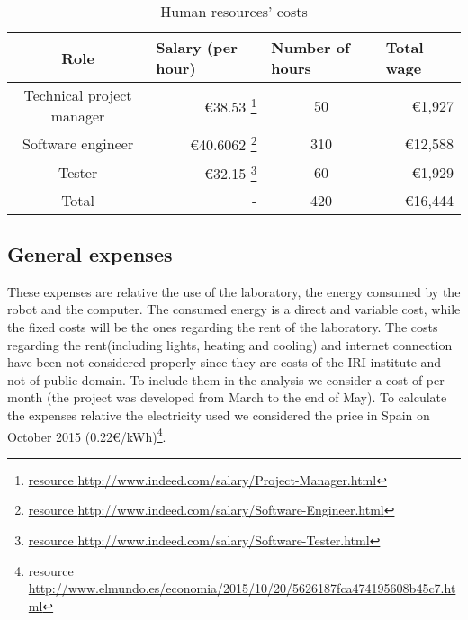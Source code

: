 \begin{savenotes}%
\begin{table}[ht]
  \centering
  \begin{tabular}{|c|r|c|r|}
    \hline
    \textbf{Role}      & \multicolumn{1}{l|}{\textbf{Salary (per hour)}} & \multicolumn{1}{l|}{\textbf{Number of hours}} & \multicolumn{1}{l|}{\textbf{Total wage}} \\ \hline\hline
    Technical project manager  & €38.53 \footnote{\href{http://www.indeed.com/salary/Project-Manager.html}{resource \url{http://www.indeed.com/salary/Project-Manager.html}}}  & 50                                           & €1,927   \\ \hline
    Software engineer & €40.6062                                         \footnote{\href{http://www.indeed.com/salary/Software-Engineer.html}{resource \url{http://www.indeed.com/salary/Software-Engineer.html}}}   & 310 & €12,588
    \\ \hline
    
    Tester             & €32.15 \footnote{\href{http://www.indeed.com/salary/Software-Tester.html}{resource \url{http://www.indeed.com/salary/Software-Tester.html}}}   & 60                                           & €1,929 \\ \hline\hline
    Total              & -                                               & 420                                         & €16,444                               \\ \hline
  \end{tabular}

  \caption{Human resources' costs}
  \label{tab:humanResources}
\end{table}
\end{savenotes}

\subsection*{General expenses}
These expenses are relative the use of the laboratory, the energy consumed by the robot and the computer. The consumed energy is a direct and variable cost, while the fixed costs will be the ones regarding the rent of the laboratory. The costs regarding the rent(including lights, heating and cooling) and internet connection have been not considered properly since they are costs of the IRI institute and not of public domain. To include them in the analysis we consider a cost of  per month (the project was developed from March to the end of May). To calculate the expenses relative the electricity used we considered the price in Spain on October 2015 (0.22€/kWh)\footnote{resource \href{http://www.elmundo.es/economia/2015/10/20/5626187fca474195608b45c7.html}{\url{http://www.elmundo.es/economia/2015/10/20/5626187fca474195608b45c7.html}}}.


